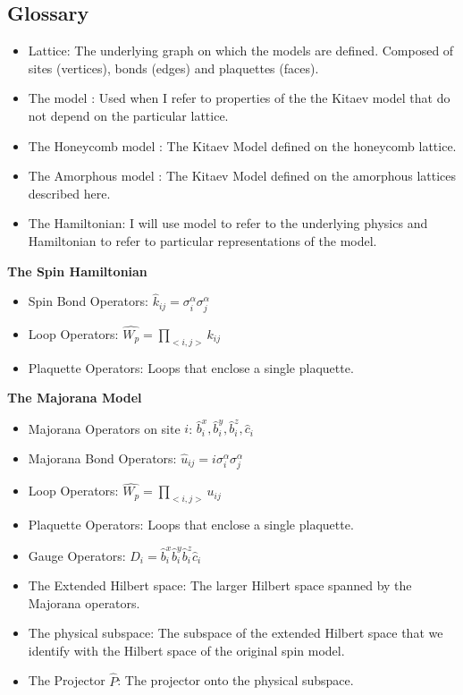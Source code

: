 \hypertarget{glossary}{%
\subsection{Glossary}\label{glossary}}

\begin{itemize}
\item
  Lattice: The underlying graph on which the models are defined. Composed of sites (vertices), bonds (edges) and plaquettes (faces).
\item
  The model : Used when I refer to properties of the the Kitaev model that do not depend on the particular lattice.
\item
  The Honeycomb model : The Kitaev Model defined on the honeycomb lattice.
\item
  The Amorphous model : The Kitaev Model defined on the amorphous lattices described here.
\item
  The Hamiltonian: I will use model to refer to the underlying physics and Hamiltonian to refer to particular representations of the model.
\end{itemize}

\textbf{The Spin Hamiltonian}

\begin{itemize}
\tightlist
\item
  Spin Bond Operators: \(\hat{k}_{ij} = \sigma_i^\alpha \sigma_j^\alpha\)
\item
  Loop Operators: \(\hat{W_p} = \prod_{<i,j>} k_{ij}\)
\item
  Plaquette Operators: Loops that enclose a single plaquette.
\end{itemize}

\textbf{The Majorana Model}

\begin{itemize}
\tightlist
\item
  Majorana Operators on site \(i\): \(\hat{b}^x_i, \hat{b}^y_i, \hat{b}^z_i, \hat{c}_i\)
\item
  Majorana Bond Operators: \(\hat{u}_{ij} = i \sigma_i^\alpha \sigma_j^\alpha\)
\item
  Loop Operators: \(\hat{W_p} = \prod_{<i,j>} u_{ij}\)
\item
  Plaquette Operators: Loops that enclose a single plaquette.
\item
  Gauge Operators: \(D_i = \hat{b}^x_i \hat{b}^y_i \hat{b}^z_i \hat{c}_i\)
\item
  The Extended Hilbert space: The larger Hilbert space spanned by the Majorana operators.
\item
  The physical subspace: The subspace of the extended Hilbert space that we identify with the Hilbert space of the original spin model.
\item
  The Projector \(\hat{P}\): The projector onto the physical subspace.
\end{itemize}

